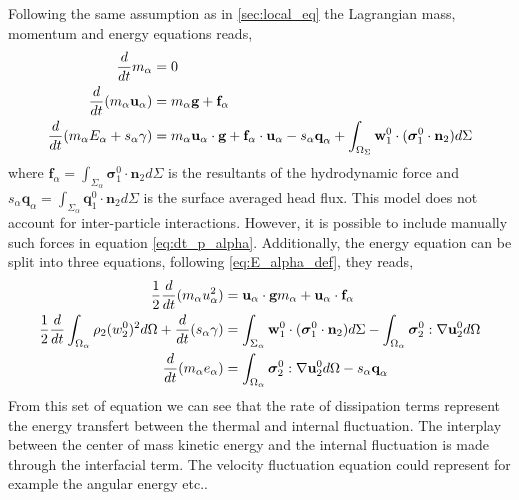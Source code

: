 Following the same assumption as in \ref{sec:local_eq} the Lagrangian  mass, momentum and energy equations reads, 
\begin{align}
    \label{eq:dt_m_alpha}
    \frac{d}{d t} m_\alpha
    &= 
    0\\
    \label{eq:dt_p_alpha}
    \frac{d}{d t} (m_\alpha \textbf{u}_\alpha)
    &= 
    m_\alpha\textbf{g}
    + \textbf{f}_\alpha\\
    \label{eq:dt_E_alpha}
    \frac{d}{d t} (m_\alpha E_\alpha + s_\alpha \gamma)
    &= 
    m_\alpha \textbf{u}_\alpha \cdot \textbf{g}
    +\textbf{f}_\alpha \cdot \textbf{u}_\alpha  
    - s_\alpha \textbf{q}_\alpha
    +\int_{\Omega_\Sigma} \textbf{w}_1^0 \cdot (\bm{\sigma}_1^0 \cdot  \textbf{n}_2) d\Sigma
\end{align}
where  $\textbf{f}_\alpha = \int_{\Sigma_\alpha}  \bm{\sigma}_1^0 \cdot \textbf{n}_2 d\Sigma$ is the resultants of the hydrodynamic force and $ s_\alpha \textbf{q}_\alpha = \int_{\Sigma_\alpha} \textbf{q}_1^0 \cdot \textbf{n}_2 d\Sigma$ is the surface averaged head flux. 
This model does not account for inter-particle interactions. 
However, it is possible to include manually such forces in equation \ref{eq:dt_p_alpha}.
Additionally, the energy equation can be split into three equations, following \ref{eq:E_alpha_def}, they reads, 
\begin{align}
    \frac{1}{2}\frac{d}{d t} (m_\alpha u_\alpha^2)
    &= 
    \textbf{u}_\alpha\cdot
    \textbf{g}m_\alpha
    + 
    \textbf{u}_\alpha\cdot
    \textbf{f}_\alpha\\
    \frac{1}{2}\frac{d}{d t} \int_{\Omega_\alpha} \rho_2 (w_2^0)^2 d\Omega 
    + \frac{d}{d t} (s_\alpha \gamma) 
    &= 
    \int_{\Sigma_\alpha} \textbf{w}_1^0 \cdot (\bm{\sigma}_1^0 \cdot \textbf{n}_2) d\Sigma  
     - \int_{\Omega_\alpha} \bm{\sigma}_2^0 : \mathbf{\nabla}\textbf{u}_2^0 d\Omega  
    \\
    \frac{d}{d t} (m_\alpha e_\alpha )
    &= 
     \int_{\Omega_\alpha} \bm{\sigma}_2^0 : \mathbf{\nabla}\textbf{u}_2^0 d\Omega  
    -  s_\alpha \textbf{q}_\alpha  
\end{align}
From this set of equation we can see that the rate of dissipation terms represent the energy transfert between the thermal and internal fluctuation. 
The interplay between the center of mass  kinetic energy and the internal fluctuation is made through the interfacial term.
The velocity fluctuation equation could represent for example the angular energy etc..  



